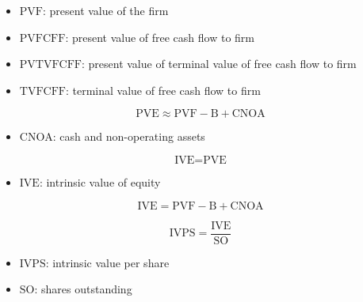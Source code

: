 \begin{itemize}
  \item[] $\text{PVF}$: present value of the firm
  \item[] $\text{PVFCFF}$: present value of free cash flow to firm
  \item[] $\text{PVTVFCFF}$: present value of terminal value of free cash flow to firm
  \item[] $\text{TVFCFF}$: terminal value of free cash flow to firm
\end{itemize}

$$
\text{PVE} \approx \text{PVF} - \text{B} + \text{CNOA}
$$

\begin{itemize}
  \item[] $\text{CNOA}$: cash and non-operating assets
\end{itemize}

$$
\text{IVE} = \text{PVE}
$$

\begin{itemize}
  \item[] $\text{IVE}$: intrinsic value of equity
\end{itemize}

$$
\text{IVE} = \text{PVF} - \text{B} + \text{CNOA}
$$

$$
\text{IVPS} = \frac{\text{IVE}}{\text{SO}}
$$

\begin{itemize}
  \item[] $\text{IVPS}$: intrinsic value per share
  \item[] $\text{SO}$: shares outstanding
\end{itemize}

\renewcommand{\arraystretch}{1.8}

